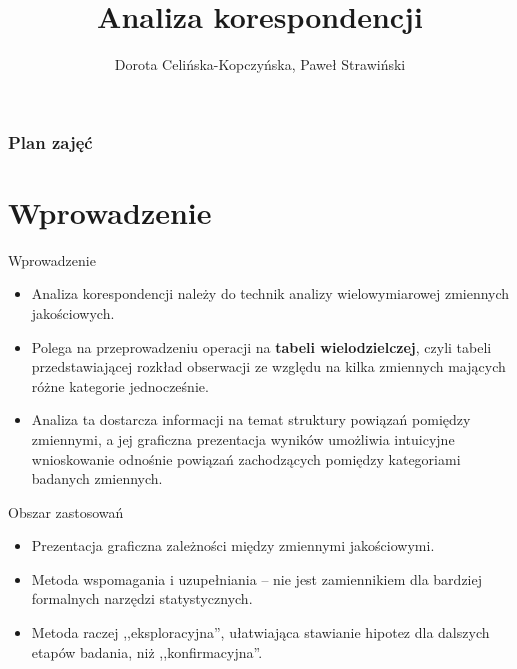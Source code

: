 \documentclass{beamer}
\begin{document}
\begin{frame}
\title[Tytuł]{Analiza korespondencji}

\author{Dorota Celińska-Kopczyńska, Paweł Strawiński}

\titlepage
\end{frame}
\begin{frame}[allowframebreaks]
\frametitle{Plan zajęć}
  \tableofcontents
\end{frame}

\section{Wprowadzenie}

\begin{frame}{Wprowadzenie}
  \begin{itemize}
  \item Analiza korespondencji należy do technik analizy wielowymiarowej zmiennych jakościowych.
  \item Polega na przeprowadzeniu operacji na \textbf{tabeli wielodzielczej}, czyli tabeli przedstawiającej rozkład obserwacji ze względu na kilka zmiennych mających różne kategorie jednocześnie.
  \item Analiza ta dostarcza informacji na temat struktury powiązań pomiędzy zmiennymi, a jej graficzna prezentacja wyników umożliwia intuicyjne wnioskowanie odnośnie powiązań zachodzących pomiędzy kategoriami badanych zmiennych. 
  \end{itemize}
\end{frame}

\begin{frame}{Obszar zastosowań}
  \begin{itemize}
  \item Prezentacja graficzna zależności między zmiennymi jakościowymi.
  \item Metoda wspomagania i uzupełniania -- nie jest zamiennikiem dla bardziej formalnych narzędzi statystycznych.
   \item Metoda raczej ,,eksploracyjna'', ułatwiająca stawianie hipotez dla dalszych etapów badania, niż ,,konfirmacyjna''.
  \end{itemize}
\end{frame}
\end{document}
